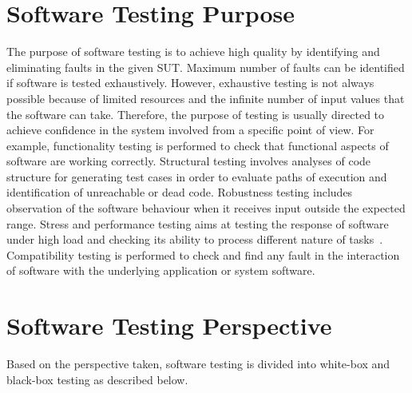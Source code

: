 \section{Software Testing Purpose}
The purpose of software testing is to achieve high quality by identifying and eliminating faults in the given SUT. Maximum number of faults can be identified if software is tested exhaustively. However, exhaustive testing is not always possible because of limited resources and the infinite number of input values that the software can take. Therefore, the purpose of testing is usually directed to achieve confidence in the system involved from a specific point of view. For example, functionality testing is performed to check that functional aspects of software are working correctly. Structural testing involves analyses of code structure for generating test cases in order to evaluate paths of execution and identification of unreachable or dead code. Robustness testing includes observation of the software behaviour when it receives input outside the expected range. Stress and performance testing aims at testing the response of software under high load and checking its ability to process different nature of tasks~\cite{cohen2005robustness}. Compatibility testing is performed to check and find any fault in the interaction of software with the underlying application or system software.

\section{Software Testing Perspective}
Based on the perspective taken, software testing is divided into white-box and black-box testing as described below.

